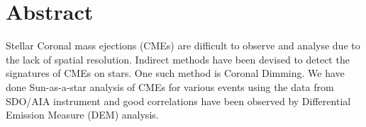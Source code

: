 \section{Abstract}

Stellar Coronal mass ejections (CMEs) are difficult to observe and analyse due to the lack of spatial resolution. Indirect methods have been devised to detect the signatures of CMEs on stars. One such method is Coronal Dimming. We have done Sun-as-a-star analysis of CMEs for various events using the data from SDO/AIA instrument and good correlations have been observed by Differential Emission Measure (DEM) analysis.


